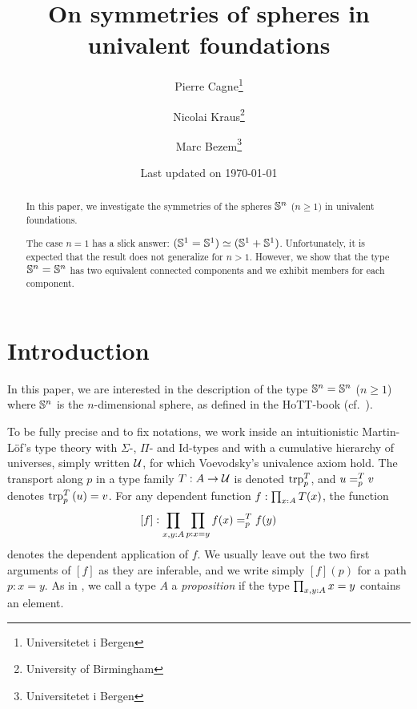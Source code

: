 \documentclass[english,a4]{article}
\title{{On symmetries of spheres in univalent foundations}}%
\author{Pierre Cagne\thanks{Universitetet i Bergen} \and Nicolai
  Kraus\thanks{University of Birmingham} \and Marc
  Bezem\thanks{Universitetet i Bergen}}%
\date{\normalsize Last updated on \today}%
\renewcommand{\ap}[1]{\left[{#1}\right]}
\begin{document}
\maketitle

\begin{abstract}
  In this paper, we investigate the symmetries of the spheres $\Sn n$
  ($n\geq 1)$ in univalent foundations.

  The case $n=1$ has a slick answer: $(\Sc = \Sc) \weq (\Sc +
  \Sc)$. Unfortunately, it is expected that the result does not
  generalize for $n>1$. However, we show that the type $\Sn n = \Sn n$
  has two equivalent connected components and we exhibit members for
  each component.
\end{abstract}


\section{Introduction}

In this paper, we are interested in the description of the type
$\Sn n = \Sn n$ ($n\geq 1$) where $\Sn n$ is the $n$-dimensional
sphere, as defined in the HoTT-book (cf.~\cite{HoTT}).

To be fully precise and to fix notations, we work inside an
intuitionistic Martin-Löf's type theory with $\Sigma$-, $\Pi$- and
$\mathrm{Id}$-types and with a cumulative hierarchy of universes,
simply written $\UU$, for which Voevodsky's univalence axiom hold. The
transport along $p$ in a type family $T:A\to \UU$ is denoted
$\trp [T] p$, and $\pathover u T p v$ denotes $\trp [T] p {(u)} = v$.
For any dependent function $f\from\prod_{x\from A}T(x)$,
the function
\begin{displaymath}
  \ap f:\prod_{x,y\from A}\prod_{p\from x=y} \pathover {f(x)} T p
  {f(y)}
\end{displaymath}
denotes the dependent application of $f$. We usually leave out the two
first arguments of $\ap f$ as they are inferable, and we write simply
$\ap f (p)$ for a path $p:x=y$. As in \cite{HoTT}, we call a type $A$
a {\em proposition} if the type $\prod_{x,y\from A} x=y$ contains an
element.
\end{document}
